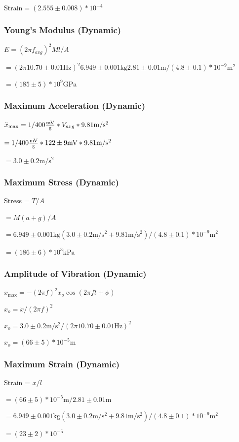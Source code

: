 \documentclass[]{article}
\newcommand{\strainMax}{\ensuremath{(2.555 \pm 0.008)*10^{-4}}}
\newcommand{\dynamicWireLength}{\ensuremath{2.81 \pm 0.01 \si{\meter}}}
\newcommand{\dynamicArea}{\ensuremath{(4.8 \pm 0.1)*10^{-9} \si{\meter^{2}}}}
\newcommand{\M}{\ensuremath{6.949 \pm 0.001\si{\kilo\gram}}}
\newcommand{\freq}{\ensuremath{10.70 \pm 0.01\si{\hertz}}}
\newcommand{\Edynamic}{\ensuremath{(185 \pm 5)*10^{9}\si{\giga\pascal}}}
\newcommand{\sensitivity}{\ensuremath{400\si{\frac{\milli\volt}{g}}}}
\newcommand{\voltage}{\ensuremath{122 \pm 9\si{\milli\volt}}}
\newcommand{\acceleration}{\ensuremath{3.0 \pm 0.2\si{\meter\per\second^2}}}
\newcommand{\stressMaxDynamic}{\ensuremath{(186 \pm 6)*10^{3}\si{\kilo\pascal}}}
\newcommand{\xo}{\ensuremath{(66 \pm 5)*10^{-5}\si{\meter}}}
\newcommand{\strainMaxDynamic}{\ensuremath{(23 \pm 2)*10^{-5}}}
\begin{document}
Strain$= \strainMax$

\subsubsection{Young's Modulus (Dynamic)}
$E = {(2\pi f_{avg})}^2 Ml/A$

$= {(2\pi \freq)}^2 \M\dynamicWireLength/\dynamicArea$

$= \Edynamic$

\subsubsection{Maximum Acceleration (Dynamic)}
$\ddot{x}_{\max} = 1/\sensitivity * V_{avg} * 9.81\si{\meter\per\second^2}$

$= 1/\sensitivity * \voltage * 9.81\si{\meter\per\second^2}$

$= \acceleration$

\subsubsection{Maximum Stress (Dynamic)}
Stress = $T/A$

$= M(a + g)/A$

$= \M(\acceleration + 9.81\si{\meter\per\second^2})/\dynamicArea$

$= \stressMaxDynamic$

\subsubsection{Amplitude of Vibration (Dynamic)}
$\ddot{x}_{\max} = -{(2\pi f)}^2 x_o \cos(2\pi ft + \phi)$

$x_o = \ddot{x}/{(2\pi f)}^2$

$x_o = \acceleration/{(2\pi \freq)}^2$

$x_o = \xo$

\subsubsection{Maximum Strain (Dynamic)}
Strain = $x/l$

$= \xo/\dynamicWireLength$

$= \M(\acceleration + 9.81\si{\meter\per\second^2})/\dynamicArea$

$= \strainMaxDynamic$


\end{document}
